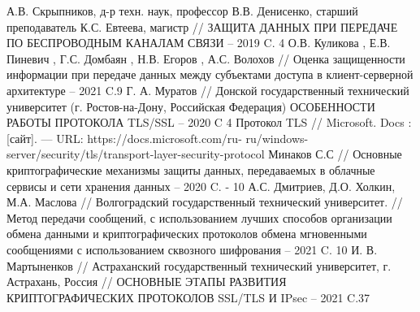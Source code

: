 \documentclass[a4paper]{article}
\begin{document}
	
\begin{thebibliography}{3}
	А.В. Скрыпников, д-р техн. наук, профессор
	В.В. Денисенко, старший преподаватель
	К.С. Евтеева, магистр // ЗАЩИТА ДАННЫХ ПРИ ПЕРЕДАЧЕ ПО БЕСПРОВОДНЫМ КАНАЛАМ СВЯЗИ -- 2019 C. 4
	О.В. Куликова , Е.В. Пиневич , Г.С. Домбаян , Н.В. Егоров , А.С.
Волохов // Оценка защищенности информации при передаче данных между
	субъектами доступа в клиент-серверной архитектуре -- 2021 C.9
	Г. А. Муратов
 //
	Донской государственный технический университет (г. Ростов-на-Дону, Российская Федерация)
	ОСОБЕННОСТИ РАБОТЫ ПРОТОКОЛА TLS/SSL -- 2020 C 4
	Протокол TLS // Microsoft. Docs : [сайт]. — URL: https://docs.microsoft.com/ru-
	ru/windows-server/security/tls/transport-layer-security-protocol 
	\bibitem{}
	Минаков С.С // Основные криптографические механизмы
	защиты данных, передаваемых
	в облачные сервисы и сети хранения данных -- 2020 C. - 10
	А.С. Дмитриев, Д.О. Холкин, М.А. Маслова
//
	Волгоградский государственный технический университет. // Метод передачи сообщений, с использованием лучших способов
	организации обмена данными и криптографических протоколов обмена
	мгновенными сообщениями с использованием сквозного шифрования -- 2021 C. 10
	И. В. Мартыненков
//
	Астраханский государственный технический университет, г. Астрахань, Россия //
	ОСНОВНЫЕ ЭТАПЫ РАЗВИТИЯ КРИПТОГРАФИЧЕСКИХ
	ПРОТОКОЛОВ SSL/TLS И IPsec -- 2021 C.37
\end{thebibliography}
\end{document}
